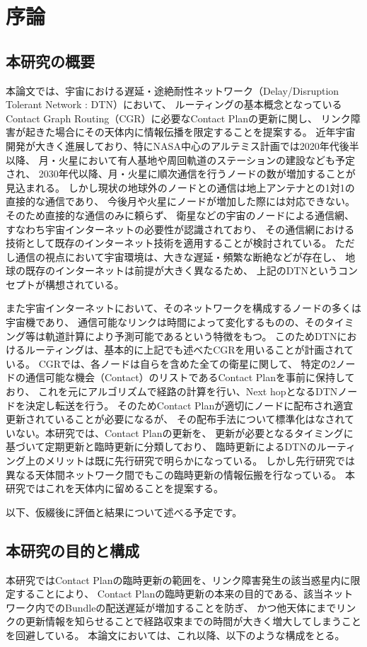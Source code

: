\chapter{序論}

\section{本研究の概要}
本論文では、宇宙における遅延・途絶耐性ネットワーク（Delay/Disruption Tolerant Network : DTN）において、
ルーティングの基本概念となっているContact Graph Routing（CGR）に必要なContact Planの更新に関し、
リンク障害が起きた場合にその天体内に情報伝播を限定することを提案する。
近年宇宙開発が大きく進展しており、特にNASA中心のアルテミス計画では2020年代後半以降、
月・火星において有人基地や周回軌道のステーションの建設なども予定され、
2030年代以降、月・火星に順次通信を行うノードの数が増加することが見込まれる。
しかし現状の地球外のノードとの通信は地上アンテナとの1対1の直接的な通信であり、
今後月や火星にノードが増加した際には対応できない。そのため直接的な通信のみに頼らず、
衛星などの宇宙のノードによる通信網、すなわち宇宙インターネットの必要性が認識されており、
その通信網における技術として既存のインターネット技術を適用することが検討されている。
ただし通信の視点において宇宙環境は、大きな遅延・頻繁な断絶などが存在し、
地球の既存のインターネットは前提が大きく異なるため、
上記のDTNというコンセプトが構想されている。

また宇宙インターネットにおいて、そのネットワークを構成するノードの多くは宇宙機であり、
通信可能なリンクは時間によって変化するものの、そのタイミング等は軌道計算により予測可能であるという特徴をもつ。
このためDTNにおけるルーティングは、基本的に上記でも述べたCGRを用いることが計画されている。
CGRでは、各ノードは自らを含めた全ての衛星に関して、
特定の2ノードの通信可能な機会（Contact）のリストであるContact Planを事前に保持しており、
これを元にアルゴリズムで経路の計算を行い、Next hopとなるDTNノードを決定し転送を行う。
そのためContact Planが適切にノードに配布され適宜更新されていることが必要になるが、
その配布手法について標準化はなされていない。本研究では、Contact Planの更新を、
更新が必要となるタイミングに基づいて定期更新と臨時更新に分類しており、
臨時更新によるDTNのルーティング上のメリットは既に先行研究で明らかになっている。
しかし先行研究では異なる天体間ネットワーク間でもこの臨時更新の情報伝搬を行なっている。
本研究ではこれを天体内に留めることを提案する。

以下、仮綴後に評価と結果について述べる予定です。
\section{本研究の目的と構成}
本研究ではContact Planの臨時更新の範囲を、リンク障害発生の該当惑星内に限定することにより、
Contact Planの臨時更新の本来の目的である、該当ネットワーク内でのBundleの配送遅延が増加することを防ぎ、
かつ他天体にまでリンクの更新情報を知らせることで経路収束までの時間が大きく増大してしまうことを回避している。
本論文においては、これ以降、以下のような構成をとる。

